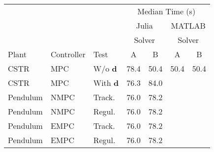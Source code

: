 \begin{tabular}{lllcccc}
	
\toprule %

	  &	& & \multicolumn{4}{c}{Median Time (s)} \\ \cmidrule(l){4-7}
	  & & & \multicolumn{2}{c}{Julia} & \multicolumn{2}{c}{MATLAB}  \\ 
	  \cmidrule(lr){4-5} \cmidrule(l){6-7} 
	  & & & \multicolumn{2}{c}{Solver} & \multicolumn{2}{c}{Solver} \\
	  \cmidrule(lr){4-5} \cmidrule(l){6-7} 
Plant & Controller & Test & A & B & A & B \\
\midrule %

CSTR		& MPC	& W/o  $\mathbf{d}$		& \num{78.4} & \num{50.4} & \num{50.4} & \num{50.4} \\
CSTR		& MPC	& With $\mathbf{d}$ 	& \num{76.3} & \num{84.0}  	\\
Pendulum 	& NMPC	& Track. 	   			& \num{76.0} & \num{78.2}  	\\
Pendulum    & NMPC	& Regul. 				& \num{76.0} & \num{78.2} 	\\
Pendulum    & EMPC	& Track.				& \num{76.0} & \num{78.2} 	\\
Pendulum	& EMPC	& Regul. 				& \num{76.0} & \num{78.2}  	\\
	
\bottomrule %
	
\end{tabular}